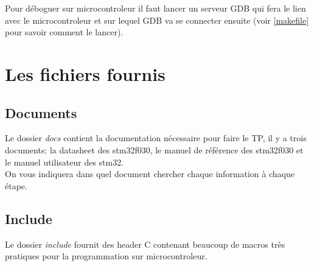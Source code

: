 \documentclass[a4paper,10pt]{article} %
\begin{document}
Pour déboguer sur microcontroleur il faut lancer un serveur GDB qui fera le lien avec le microcontroleur et sur lequel GDB va se connecter ensuite (voir \autoref{makefile}  pour savoir comment le lancer).

\section{\label{fichiers_fournis}Les fichiers fournis}
\subsection{\label{documents}Documents}
Le dossier \textit{docs} contient la documentation nécessaire pour faire le TP, il y a trois documents: la datasheet des stm32f030, le manuel de référence des stm32f030 et le manuel utilisateur des stm32.\\

On vous indiquera dans quel document chercher chaque information à chaque étape.

\subsection{\label{include}Include}
Le dossier \textit{include} fournit des header C contenant beaucoup de macros très pratiques pour la programmation sur microcontroleur.\\
\end{document}
